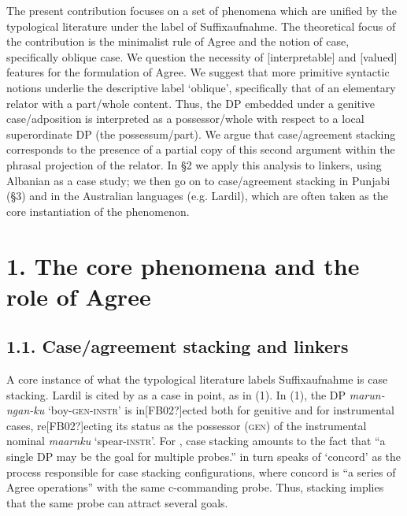 \documentclass[output=paper]{langsci/langscibook}
\begin{document}
\begin{stylelsAbstract}
The present contribution focuses on a set of phenomena which are unified by the typological literature under the label of Suffixaufnahme. The theoretical focus of the contribution is the minimalist rule of Agree and the notion of case, specifically oblique case. We question the necessity of [interpretable] and [valued] features for the formulation of Agree. We suggest that more primitive syntactic notions underlie the descriptive label ‘oblique’, specifically that of an elementary relator with a part/whole content. Thus, the DP embedded under a genitive case/adposition is interpreted as a possessor/whole with respect to a local superordinate DP (the possessum/part). We argue that case/agreement stacking corresponds to the presence of a partial copy of this second argument within the phrasal projection of the relator. In §2 we apply this analysis to linkers, using Albanian as a case study; we then go on to case/agreement stacking in Punjabi (§3) and in the Australian languages (e.g. Lardil), which are often taken as the core instantiation of the phenomenon.  
\end{stylelsAbstract}

\section{ 1. The core phenomena and the role of Agree}

\subsection{ 1.1. Case/agreement stacking and linkers} 

\begin{styleSfondomedioiColorexxi}
A core instance of what the typological literature labels Suffixaufnahme \citep{Plank1995} is case stacking. Lardil is cited by \citet{Richards2013} as a case in point, as in (1). In (1), the DP \textit{marun-ngan-ku} ‘boy-\textsc{gen-instr}’ is in[FB02?]ected both for genitive and for instrumental cases, re[FB02?]ecting its status as the possessor (\textsc{gen}) of the instrumental nominal \textit{maarnku} ‘spear-\textsc{instr}’. For \citet[62]{Merchant2006}, case stacking amounts to the fact that “a single DP may be the goal for multiple probes.” \citet{Richards2013} in turn speaks of ‘concord’ as the process responsible for case stacking configurations, where concord is “a series of Agree operations” with the same c-commanding probe. Thus, stacking implies that the same probe can attract several goals.
\end{styleSfondomedioiColorexxi}
\end{document}
